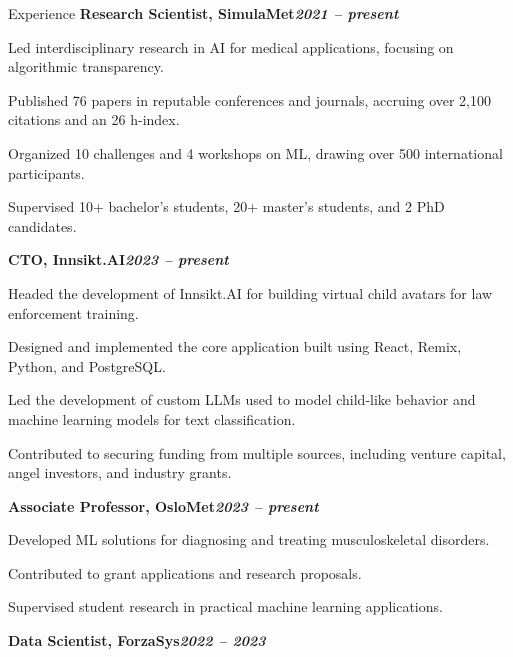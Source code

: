 \begin{rubric}{Experience}
%
\entry*[]%
\textbf{Research Scientist, SimulaMet\hfill\textit{2021 -- present}} \par
\begin{compactitem}
    \item Led interdisciplinary research in AI for medical applications, focusing on algorithmic transparency.
    \item Published 76 papers in reputable conferences and journals, accruing over 2,100 citations and an 26 h-index.
    \item Organized 10 challenges and 4 workshops on ML, drawing over 500 international participants.
    \item Supervised 10+ bachelor's students, 20+ master's students, and 2 PhD candidates.
    \vspace{-12pt}
\end{compactitem}
%
\entry*[]%
\textbf{CTO, Innsikt.AI\hfill\textit{2023 -- present}} \par
\begin{compactitem}
    \item Headed the development of Innsikt.AI for building virtual child avatars for law enforcement training.
    \item Designed and implemented the core application built using React, Remix, Python, and PostgreSQL.
    \item Led the development of custom LLMs used to model child-like behavior and machine learning models for text classification.
    \item Contributed to securing funding from multiple sources, including venture capital, angel investors, and industry grants.
    \vspace{-12pt}
\end{compactitem}
%
\entry*[]%
\textbf{Associate Professor, OsloMet\hfill\textit{2023 -- present}} \par
\begin{compactitem}
    \item Developed ML solutions for diagnosing and treating musculoskeletal disorders.
    \item Contributed to grant applications and research proposals.
    \item Supervised student research in practical machine learning applications.
    \vspace{-12pt}
\end{compactitem}
%
\entry*[]%
\textbf{Data Scientist, ForzaSys\hfill\textit{2022 -- 2023}} \par

\end{rubric}
